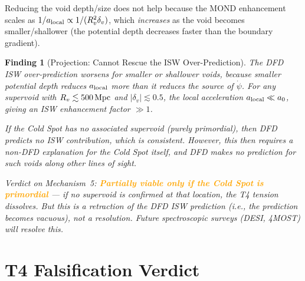 \documentclass[11pt]{article}
\newtheorem{finding}{Finding}
\begin{document}
Reducing the void depth/size does not help because the MOND enhancement
scales as $1/a_{\rm local} \propto 1/(R_v^2\delta_v)$, which \emph{increases}
as the void becomes smaller/shallower (the potential depth decreases
faster than the boundary gradient).

\begin{finding}[Projection: Cannot Rescue the ISW Over-Prediction]\label{find:projection}
The DFD ISW over-prediction worsens for smaller or shallower voids, because
smaller potential depth reduces $a_{\rm local}$ more than it reduces the
source of $\dot\psi$.  For any supervoid with $R_v \lesssim 500\,{\rm Mpc}$
and $|\delta_v| \lesssim 0.5$, the local acceleration $a_{\rm local} \ll a_0$,
giving an ISW enhancement factor $\gg 1$.

If the Cold Spot has \emph{no} associated supervoid (purely primordial),
then DFD predicts no ISW contribution, which is consistent. However,
this then requires a non-DFD explanation for the Cold Spot itself, and
DFD makes no prediction for such voids along other lines of sight.

\textit{Verdict on Mechanism~5:} \textcolor{orange}{\textbf{Partially viable
only if the Cold Spot is primordial}} --- if no supervoid is confirmed at
that location, the T4 tension dissolves. But this is a retraction of the
DFD ISW prediction (i.e., the prediction becomes vacuous), not a resolution.
Future spectroscopic surveys (DESI, 4MOST) will resolve this.
\end{finding}

\section{T4 Falsification Verdict}
\label{sec:t4-verdict}
\end{document}
